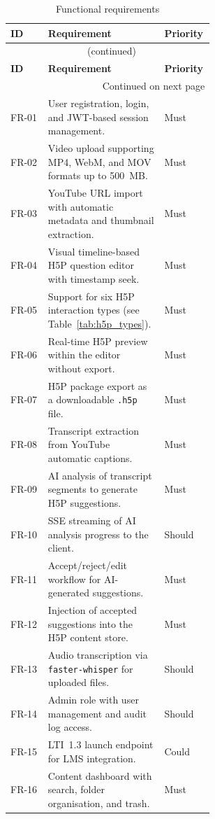 \begin{longtable}{lp{0.58\linewidth}l}
  \caption{Functional requirements}
  \label{tab:functional_reqs} \\
  \toprule
  \textbf{ID} & \textbf{Requirement} & \textbf{Priority} \\
  \midrule
  \endfirsthead
  \multicolumn{3}{c}{\tablename\ \thetable{} (continued)} \\
  \toprule
  \textbf{ID} & \textbf{Requirement} & \textbf{Priority} \\
  \midrule
  \endhead
  \midrule
  \multicolumn{3}{r}{Continued on next page} \\
  \endfoot
  \bottomrule
  \endlastfoot
  FR-01 & User registration, login, and JWT-based session management. & Must \\
  FR-02 & Video upload supporting MP4, WebM, and MOV formats up to 500~MB. & Must \\
  FR-03 & YouTube URL import with automatic metadata and thumbnail extraction. & Must \\
  FR-04 & Visual timeline-based H5P question editor with timestamp seek. & Must \\
  FR-05 & Support for six H5P interaction types (see Table~\ref{tab:h5p_types}). & Must \\
  FR-06 & Real-time H5P preview within the editor without export. & Must \\
  FR-07 & H5P package export as a downloadable \texttt{.h5p} file. & Must \\
  FR-08 & Transcript extraction from YouTube automatic captions. & Must \\
  FR-09 & AI analysis of transcript segments to generate H5P suggestions. & Must \\
  FR-10 & SSE streaming of AI analysis progress to the client. & Should \\
  FR-11 & Accept/reject/edit workflow for AI-generated suggestions. & Must \\
  FR-12 & Injection of accepted suggestions into the H5P content store. & Must \\
  FR-13 & Audio transcription via \texttt{faster-whisper} for uploaded files. & Should \\
  FR-14 & Admin role with user management and audit log access. & Should \\
  FR-15 & LTI~1.3 launch endpoint for LMS integration. & Could \\
  FR-16 & Content dashboard with search, folder organisation, and trash. & Must \\
\end{longtable}

